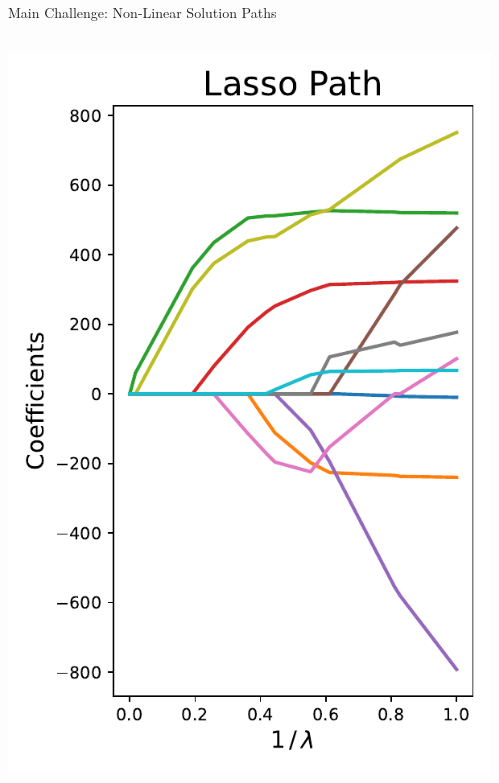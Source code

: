 \documentclass[usenames,dvipsnames,mathserif,notheorems]{beamer}
\begin{document}
\begin{frame}{Main Challenge: Non-Linear Solution Paths}

	\begin{columns}
		\begin{column}{0.5\textwidth}
			\centering
			\includegraphics[width=\textwidth]{assets/lasso_path.pdf}
		\end{column}
		\pause
		\begin{column}{0.5\textwidth}
			\centering

\end{column}
\end{columns}
\end{frame}
\end{document}
